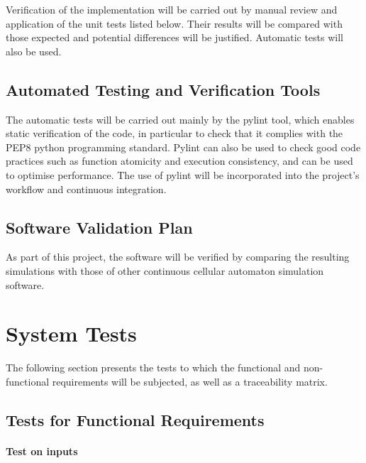 \documentclass[12pt, titlepage]{article}
\begin{document}
Verification of the implementation will be carried out by manual review and application of the unit tests listed below. 
Their results will be compared with those expected and potential differences will be justified.
Automatic tests will also be used.

\subsection{Automated Testing and Verification Tools}

The automatic tests will be carried out mainly by the pylint tool, which enables static verification of the code, in particular to check that it complies with the PEP8 python programming standard.
Pylint can also be used to check good code practices such as function atomicity and execution consistency, and can be used to optimise performance.
The use of pylint will be incorporated into the project's workflow and continuous integration.

\subsection{Software Validation Plan}

As part of this project, the software will be verified by comparing the resulting simulations with those of other continuous cellular automaton simulation software.

\section{System Tests}

The following section presents the tests to which the functional and non-functional requirements will be subjected, as well as a traceability matrix.

\subsection{Tests for Functional Requirements}
		
\paragraph{Test on inputs}
\end{document}
